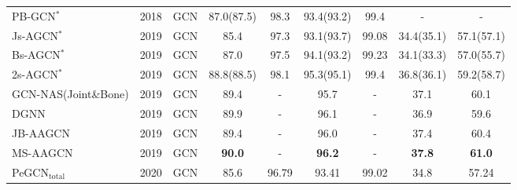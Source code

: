 \documentclass[runningheads]{llncs}
\begin{document}
\begin{table*}[h]
{\begin{tabular}{l c c c c c c c c}
        \multicolumn{1}{l}{PB-GCN$^{*}$ \cite{thakkar2018part}} & 2018 & GCN  &  87.0(87.5) & 98.3 & 93.4(93.2) & 99.4 & - & -\\
        \multicolumn{1}{l}{Js-AGCN$^{*}$ \cite{shi2019two}}& 2019 &GCN   & 85.4 & 97.3  & 93.1(93.7)   & 99.08  & 34.4(35.1) & 57.1(57.1) \\
		\multicolumn{1}{l}{Bs-AGCN$^{*}$ \cite{shi2019two}}& 2019  &GCN   & 87.0 & 97.5  & 94.1(93.2) &  99.23   & 34.1(33.3) &57.0(55.7)  \\
		\multicolumn{1}{l}{2s-AGCN$^{*}$ \cite{shi2019two}}& 2019 &GCN   & 88.8(88.5) & 98.1  & 95.3(95.1)  & 99.4 & 36.8(36.1) & 59.2(58.7)  \\
		\multicolumn{1}{l}{GCN-NAS(Joint\&Bone) \cite{peng2019learning}}& 2019 &GCN & 89.4 &- &95.7 &- &37.1& 60.1  \\
     	\multicolumn{1}{l}{DGNN \cite{shi2019skeleton}}& 2019 & GCN & 89.9  &- & 96.1 &- & 36.9 & 59.6 \\
		\multicolumn{1}{l}{JB-AAGCN \cite{shi2019multi}}& 2019 &GCN & 89.4 & - & 96.0 &- & 37.4 & 60.4  \\
		\multicolumn{1}{l}{MS-AAGCN \cite{shi2019multi}}& 2019 &GCN & \textbf{90.0} & - & \textbf{96.2} &- & \textbf{37.8} & \textbf{61.0}  \\
	    \midrule
		\multicolumn{1}{l}{PeGCN$_{\text{total}}$}& 2020 & GCN & 85.6 &	96.79&  93.41&	99.02&  34.8&	57.24 \\
		\midrule
		\bottomrule
	\end{tabular}
}
	\label{tab:normal:apx}
	\vspace{-4ex}
\end{table*}
\end{document}

